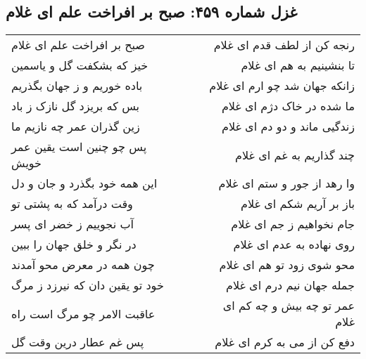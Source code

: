 \begin{center}
\section*{غزل شماره ۴۵۹: صبح بر افراخت علم ای غلام}
\label{sec:459}
\begin{longtable}{l p{0.5cm} r}
صبح بر افراخت علم ای غلام
&&
رنجه کن از لطف قدم ای غلام
\\
خیز که بشکفت گل و یاسمین
&&
تا بنشینیم به هم ای غلام
\\
باده خوریم و ز جهان بگذریم
&&
زانکه جهان شد چو ارم ای غلام
\\
بس که بریزد گل نازک ز باد
&&
ما شده در خاک دژم ای غلام
\\
زین گذران عمر چه نازیم ما
&&
زندگیی ماند و دو دم ای غلام
\\
پس چو چنین است یقین عمر خویش
&&
چند گذاریم به غم ای غلام
\\
این همه خود بگذرد و جان و دل
&&
وا رهد از جور و ستم ای غلام
\\
وقت درآمد که به پشتی تو
&&
باز بر آریم شکم ای غلام
\\
آب نجوییم ز خضر ای پسر
&&
جام نخواهیم ز جم ای غلام
\\
در نگر و خلق جهان را ببین
&&
روی نهاده به عدم ای غلام
\\
چون همه در معرض محو آمدند
&&
محو شوی زود تو هم ای غلام
\\
خود تو یقین دان که نیرزد ز مرگ
&&
جمله جهان نیم درم ای غلام
\\
عاقبت الامر چو مرگ است راه
&&
عمر تو چه بیش و چه کم ای غلام
\\
پس غم عطار درین وقت گل
&&
دفع کن از می به کرم ای غلام
\\
\end{longtable}
\end{center}
